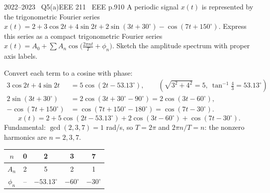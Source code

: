 \begin{qcard}{2022--2023 \textbullet\ Q5(a)}{EEE 211 \textbullet\ EEE p.9}{10}
A periodic signal $x(t)$ is represented by the trigonometric Fourier series $x(t)=2+3\cos2t+4\sin2t+2\sin(3t+30^\circ)-\cos(7t+150^\circ)$. Express this series as a compact trigonometric Fourier series $x(t)=A_0+\sum A_n\cos\big(\frac{2\pi nt}{T}+\phi_n\big)$. Sketch the amplitude spectrum with proper axis labels.
\end{qcard}
\begin{solution}
Convert each term to a cosine with phase:
\begin{align*}
3\cos2t+4\sin2t&=5\cos(2t-53.13^\circ),\qquad(\sqrt{3^2+4^2}=5,\ \tan^{-1}\tfrac43=53.13^\circ)\\
2\sin(3t+30^\circ)&=2\cos(3t+30^\circ-90^\circ)=2\cos(3t-60^\circ),\\
-\cos(7t+150^\circ)&=\cos(7t+150^\circ-180^\circ)=\cos(7t-30^\circ).
\end{align*}
\[x(t)=2+5\cos(2t-53.13^\circ)+2\cos(3t-60^\circ)+\cos(7t-30^\circ).\]
Fundamental: $\gcd(2,3,7)=1$ rad/s, so $T=2\pi$ and $2\pi n/T=n$: the nonzero harmonics are $n=2,3,7$.
\begin{center}\small\begin{tabular}{@{}c|cccc@{}}$n$&0&2&3&7\\\hline$A_n$&2&5&2&1\\$\phi_n$&--&$-53.13^\circ$&$-60^\circ$&$-30^\circ$\end{tabular}\end{center}
\begin{center}\end{center}
\end{solution}

